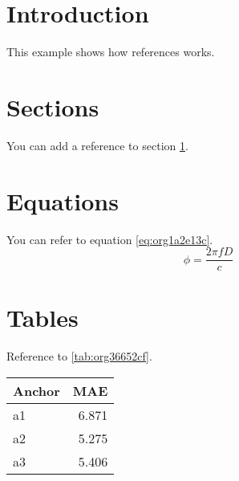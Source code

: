 


\section{Introduction}
\label{sec:org40b42a9}
This example shows how references works.

\section{Sections}
\label{sec:org689805a}
You can add a reference to section \ref{sec:org40b42a9}.

\section{Equations}
\label{sec:orgedb92f8}
You can refer to equation \ref{eq:org1a2e13c}.
\begin{equation}
\label{eq:org1a2e13c}
\phi = \frac{2\pi fD}{c}
\end{equation}

\section{Tables}
\label{sec:org8972da3}
Reference to \ref{tab:org36652cf}.

\begin{center}
\label{tab:org36652cf}
\begin{tabular}{lr}
Anchor & MAE\\
\hline
a1 & 6.871\\
a2 & 5.275\\
a3 & 5.406\\
\end{tabular}
\end{center}


